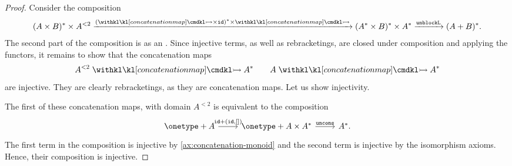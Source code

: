 \begin{proof}
    Consider the composition
    \begin{align*}
        (A \times B)^* \times A^{<2}
        \xrightarrow{(\concmap \times \idterm)^* \times \concmap}
        (A^* \times B)^* \times A^*
        \xrightarrow{\unblocklterm}
        (A+B)^*.
    \end{align*}
    The second part of the composition is  as an . Since injective terms, as well as rebracketings,  are closed under composition and applying the functors, it remains to show that the concatenation maps
    \begin{align*}
        A^{<2}  \concmap A^*
        \qquad
        A \concmap A^*
    \end{align*}
    are  injective. They are clearly rebracketings, as they are concatenation maps. Let us show injectivity.

    The first of these concatenation maps, with domain $A^{<2}$ is equivalent to the  composition
    \[
        \begin{tikzcd}
            \onetype + A
            \ar[r,"{\idterm + (\idterm, [])}"]
            &
            \onetype + A \times A^*
            \ar[r, "\unconsterm"]
            &
            A^*.
        \end{tikzcd}
    \]
    The first term in the composition is injective by \cref{ax:concatenation-monoid} and the second term is injective by the isomorphism axioms. Hence, their composition is injective.


\end{proof}
